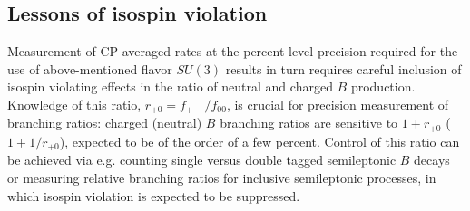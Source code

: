 \subsection{Lessons of isospin violation}
Measurement of CP averaged rates at the percent-level precision required for the use of above-mentioned flavor $SU(3)$ results in turn requires careful inclusion of isospin violating effects in the ratio of neutral and charged $B$ production. Knowledge of this ratio, $r_{+0} = f_{+-}/f_{00}$, is crucial for precision measurement of branching ratios:  charged (neutral) $B$ branching ratios are sensitive to $1 + r_{+0}$ ($1 + 1/r_{+0}$),  expected to be of the order of a few percent. Control of this ratio can be achieved via e.g. counting single versus double tagged semileptonic $B$ decays or measuring relative branching ratios for inclusive semileptonic processes, in which isospin violation is expected to be suppressed. 

%






